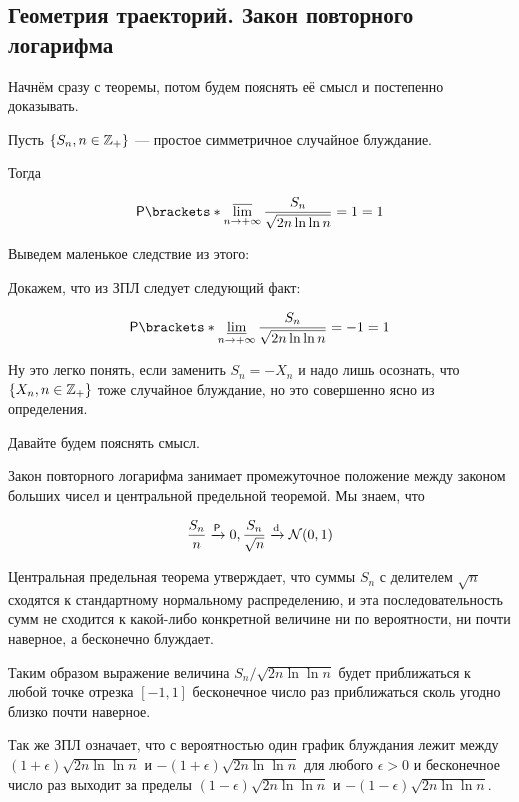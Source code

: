 \subsection{Геометрия траекторий. Закон повторного логарифма}

Начнём сразу с теоремы, потом будем пояснять её смысл и постепенно доказывать.

\begin{theorem}
  Пусть $\{S_n, n \in \mathbb{Z}_+\}$ --- простое симметричное случайное блуждание.

  Тогда 

  \[
    \Pr{\varlimsup\limits_{n \to +\infty} \frac{S_n}{\sqrt{2n\ln\ln n}} = 1} = 1
  \]
\end{theorem}

Выведем маленькое следствие из этого:

\begin{remark}
  Докажем, что из ЗПЛ следует следующий факт:

  \[
    \Pr{\varliminf\limits_{n \to +\infty} \frac{S_n}{\sqrt{2n\ln\ln n}} = -1} = 1
  \]

  Ну это легко понять, если заменить $S_n = -X_n$ и надо лишь осознать, что 
  $\{X_n, n \in \mathbb{Z}_+\}$
  тоже случайное блуждание, но это совершенно ясно из определения.
\end{remark}

Давайте будем пояснять смысл.

Закон повторного логарифма занимает промежуточное положение между законом 
больших чисел и центральной предельной теоремой. Мы знаем, что

\[
  \frac{S_n}{n} \prto 0, \frac{S_n}{\sqrt{n}} \dto \mathcal{N}(0, 1)
\]

Центральная предельная теорема утверждает, что суммы $S_{n}$ с делителем
$\sqrt{n}$ сходятся к стандартному нормальному распределению, и эта
последовательность сумм не сходится к какой-либо конкретной величине ни по
вероятности, ни почти наверное, а бесконечно блуждает.

Таким образом выражение величина $S_{n}/{\sqrt{2n\ln \ln n}}$ будет
приближаться к любой точке отрезка $[-1, 1]$ бесконечное число раз приближаться
сколь угодно близко почти наверное.

Так же ЗПЛ означает, что с вероятностью один график блуждания лежит между 
$(1 + \epsilon){\sqrt{2n\ln \ln n}}$ и $-(1 + \epsilon){\sqrt{2n\ln \ln n}}$
для любого $\epsilon > 0$ и бесконечное число раз выходит за пределы
$(1 - \epsilon){\sqrt{2n\ln \ln n}}$ и $-(1 - \epsilon){\sqrt{2n\ln \ln n}}$.

